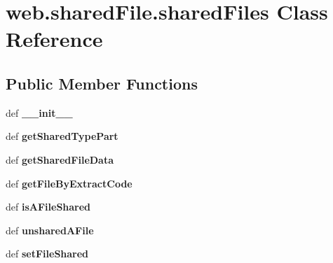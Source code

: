 \hypertarget{classweb_1_1shared_file_1_1shared_files}{\section{web.\-shared\-File.\-shared\-Files Class Reference}
\label{classweb_1_1shared_file_1_1shared_files}
}
\subsection*{Public Member Functions}
\begin{DoxyCompactItemize}
\item 
\hypertarget{classweb_1_1shared_file_1_1shared_files_a54b216cc930a9fe0b572afee357d604b}{def {\bfseries \-\_\-\-\_\-init\-\_\-\-\_\-}}\label{classweb_1_1shared_file_1_1shared_files_a54b216cc930a9fe0b572afee357d604b}

\item 
\hypertarget{classweb_1_1shared_file_1_1shared_files_a39a92b7d406e5a5f887055cc306bcd73}{def {\bfseries get\-Shared\-Type\-Part}}\label{classweb_1_1shared_file_1_1shared_files_a39a92b7d406e5a5f887055cc306bcd73}

\item 
\hypertarget{classweb_1_1shared_file_1_1shared_files_ae389332ca03113fc81bada755d1e2e8b}{def {\bfseries get\-Shared\-File\-Data}}\label{classweb_1_1shared_file_1_1shared_files_ae389332ca03113fc81bada755d1e2e8b}

\item 
\hypertarget{classweb_1_1shared_file_1_1shared_files_a5c082954964da4167fd2c09b2c79fbbc}{def {\bfseries get\-File\-By\-Extract\-Code}}\label{classweb_1_1shared_file_1_1shared_files_a5c082954964da4167fd2c09b2c79fbbc}

\item 
\hypertarget{classweb_1_1shared_file_1_1shared_files_ac223a4f0a76cff24f55365908414c73e}{def {\bfseries is\-A\-File\-Shared}}\label{classweb_1_1shared_file_1_1shared_files_ac223a4f0a76cff24f55365908414c73e}

\item 
\hypertarget{classweb_1_1shared_file_1_1shared_files_af0660d9e8d4aa40cde3929c2c393b414}{def {\bfseries unshared\-A\-File}}\label{classweb_1_1shared_file_1_1shared_files_af0660d9e8d4aa40cde3929c2c393b414}

\item 
\hypertarget{classweb_1_1shared_file_1_1shared_files_a4cfb47540b8bb9b5fb05251681f1b062}{def {\bfseries set\-File\-Shared}}\label{classweb_1_1shared_file_1_1shared_files_a4cfb47540b8bb9b5fb05251681f1b062}


\end{DoxyCompactItemize}
